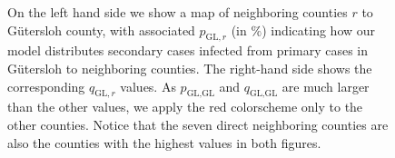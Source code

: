 \begin{figure}
   \resizebox{\textwidth}{!}{%
        
}
    \caption{On the left hand side we show a map of neighboring counties $r$ to Gütersloh county, with associated $p_{\text{GL},r}$ (in $\%$) indicating how our model distributes secondary cases infected from primary cases in Gütersloh to neighboring counties. 
The right-hand side shows the corresponding $q_{\text{GL}, r}$ values. As $p_{\text{GL}, \text{GL}}$ and $q_{\text{GL}, \text{GL}}$ are much larger than the other values, we apply the red colorscheme only to the other counties. Notice that the seven direct neighboring counties are also the counties with the highest values in both figures.}
    \label{fig:P_map_GL}
\end{figure}
